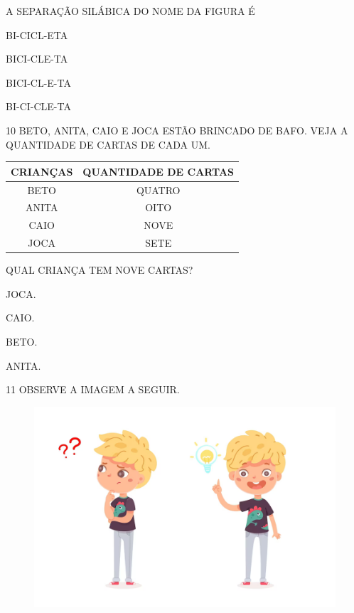 A SEPARAÇÃO SILÁBICA DO NOME DA FIGURA É

\begin{escolha}

\item BI-CICL-ETA

\item BICI-CLE-TA

\item BICI-CL-E-TA

\item BI-CI-CLE-TA

\end{escolha}

\num{10} BETO, ANITA, CAIO E JOCA ESTÃO BRINCADO DE BAFO.
VEJA A QUANTIDADE DE CARTAS DE CADA UM.

\begin{table}[H]
\centering
\begin{tabular}{|c|c|}
\hline
\textbf{CRIANÇAS} & \textbf{QUANTIDADE DE CARTAS} \\ \hline
BETO              & QUATRO                        \\ \hline
ANITA             & OITO                          \\ \hline
CAIO              & NOVE                          \\ \hline
JOCA              & SETE                          \\ \hline
\end{tabular}
\end{table}

QUAL CRIANÇA TEM NOVE CARTAS?

\begin{escolha}

\item JOCA.

\item CAIO.

\item BETO.

\item ANITA.

\end{escolha}

\num{11} OBSERVE A IMAGEM A SEGUIR.

\begin{figure}[H]
\centering
\includegraphics[width=.8\textwidth]{./media/image243.png}
\end{figure}

